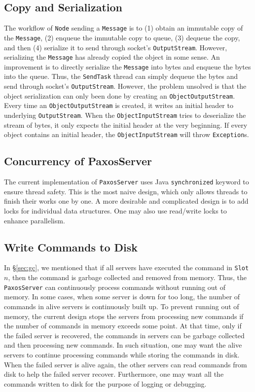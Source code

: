 \documentclass{article}
\numberwithin{equation}{section}
\begin{document}
\subsection{Copy and Serialization}
The workflow of \verb|Node| sending a \verb|Message| is to (1) obtain an immutable copy of the \verb|Message|, (2) enqueue the immutable copy to queue, (3) dequeue the copy, and then (4) serialize it to send through socket's \verb|OutputStream|. However, serializing the \verb|Message| has already copied the object in some sense. An improvement is to directly serialize the \verb|Message| into bytes and enqueue the bytes into the queue. Thus, the \verb|SendTask| thread can simply dequeue the bytes and send through socket's \verb|OutputStream|. However, the problem unsolved is that the object serialization can only been done by creating an \verb|ObjectOutputStream|. Every time an \verb|ObjectOutputStream| is created, it writes an initial header to underlying \verb|OutputStream|. When the \verb|ObjectInputStream| tries to deserialize the stream of bytes, it only expects the initial header at the very beginning. If every object contains an initial header, the \verb|ObjectInputStream| will throw \verb|Exception|s.

\subsection{Concurrency of PaxosServer}
The current implementation of \verb|PaxosServer| uses Java \verb|synchronized| keyword to ensure thread safety. This is the most naive design, which only allows threads to finish their works one by one. A more desirable and complicated design is to add locks for individual data structures. One may also use read/write locks to enhance parallelism.

\subsection{Write Commands to Disk}
In \S\ref{sec:gc}, we mentioned that if all servers have executed the command in \verb|Slot| $n$, then the command is garbage collected and removed from memory. Thus, the \verb|PaxosServer| can continuously process commands without running out of memory. In some cases, when some server is down for too long, the number of commands in alive servers is continuously built up. To prevent running out of memory, the current design stops the servers from processing new commands if the number of commands in memory exceeds some point. At that time, only if the failed server is recovered, the commands in servers can be garbage collected and then processing new commands. In such situation, one may want the alive servers to continue processing commands while storing the commands in disk. When the failed server is alive again, the other servers can read commands from disk to help the failed server recover. Furthermore, one may want all the commands written to disk for the purpose of logging or debugging.
\end{document}
